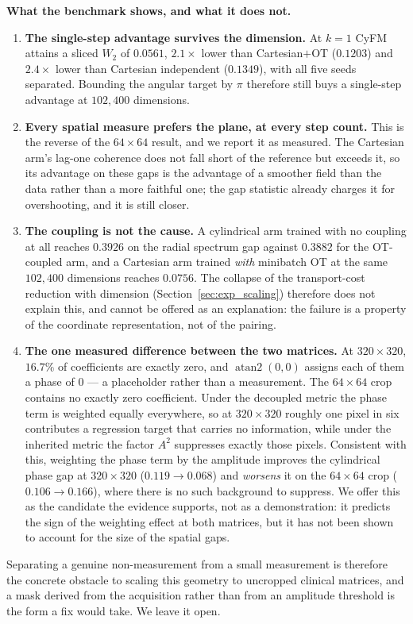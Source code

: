 \textbf{What the benchmark shows, and what it does not.}
\begin{enumerate}
    \item \textbf{The single-step advantage survives the dimension.} At $k=1$ CyFM attains a
    sliced $W_2$ of $0.0561$, $2.1\times$ lower than Cartesian$+$OT ($0.1203$) and $2.4\times$
    lower than Cartesian independent ($0.1349$), with all five seeds separated. Bounding the
    angular target by $\pi$ therefore still buys a single-step advantage at $102{,}400$
    dimensions.
    \item \textbf{Every spatial measure prefers the plane, at every step count.} This is the
    reverse of the $64\times64$ result, and we report it as measured. The Cartesian arm's
    lag-one coherence does not fall short of the reference but exceeds it, so its advantage on
    these gaps is the advantage of a smoother field than the data rather than a more faithful
    one; the gap statistic already charges it for overshooting, and it is still closer.
    \item \textbf{The coupling is not the cause.} A cylindrical arm trained with no coupling at
    all reaches $0.3926$ on the radial spectrum gap against $0.3882$ for the OT-coupled arm, and
    a Cartesian arm trained \emph{with} minibatch OT at the same $102{,}400$ dimensions reaches
    $0.0756$. The collapse of the transport-cost reduction with dimension
    (Section~\ref{sec:exp_scaling}) therefore does not explain this, and cannot be offered as an
    explanation: the failure is a property of the coordinate representation, not of the pairing.
    \item \textbf{The one measured difference between the two matrices.} At $320\times320$,
    $16.7\%$ of coefficients are exactly zero, and $\operatorname{atan2}(0,0)$ assigns each of
    them a phase of $0$ --- a placeholder rather than a measurement. The $64\times64$ crop
    contains no exactly zero coefficient. Under the decoupled metric the phase term is weighted
    equally everywhere, so at $320\times320$ roughly one pixel in six contributes a regression
    target that carries no information, while under the inherited metric the factor $A^2$
    suppresses exactly those pixels. Consistent with this, weighting the phase term by the
    amplitude improves the cylindrical phase gap at $320\times320$ ($0.119 \to 0.068$) and
    \emph{worsens} it on the $64\times64$ crop ($0.106 \to 0.166$), where there is no such
    background to suppress. We offer this as the candidate the evidence supports, not as a
    demonstration: it predicts the sign of the weighting effect at both matrices, but it has not
    been shown to account for the size of the spatial gaps.
\end{enumerate}
Separating a genuine non-measurement from a small measurement is therefore the concrete obstacle
to scaling this geometry to uncropped clinical matrices, and a mask derived from the acquisition
rather than from an amplitude threshold is the form a fix would take. We leave it open.

